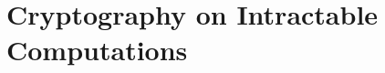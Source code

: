 \documentclass[12pt,openany]{book}
\theoremstyle{definition}
\newtheorem{exercise}{Exercise}[chapter]
\renewcommand{\abs}[1]{\left\lvert #1 \right\rvert}
\newcommand{\sol}{\textcolor{magenta}{\bf Solution}}
\newcommand{\scheme}{\Sigma}
\newcommand{\keyspace}{\mathcal{K}}
\newcommand{\messagespace}{\mathcal{M}}
\begin{document}

	\newpage
	\chapter{Cryptography on Intractable Computations}
	
	
\end{document}
